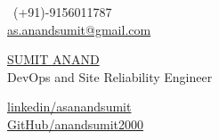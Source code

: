 \documentclass[a4,10pt]{article}
\begin{document}
\begin{center}
    \begin{minipage}[b]{0.24\textwidth}
            \ (+91)-9156011787 \\
            \normalsize \href{mailto:as.anandsumit@gmail.com}{as.anandsumit@gmail.com} 
    \end{minipage}%
    \begin{minipage}[b]{0.5\textwidth}
            \centering
            {\Huge \underline {SUMIT ANAND}} \\ %
            \vspace{0.1cm}
            {\color{UI_blue} \Large{DevOps and Site Reliability Engineer}} \\
    \end{minipage}%
    \begin{minipage}[b]{0.24\textwidth}
            \flushright \normalsize  %
            {\href{https://www.linkedin.com/in/asanandsumit/}{linkedin/asanandsumit} } \\
            \href{https://github.com/anandsumit2000}{GitHub/anandsumit2000}
    \end{minipage}   

    {\color{UI_blue} \hrulefill}
\end{center}
\end{document}
